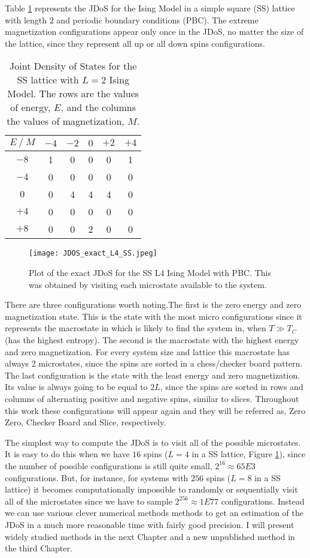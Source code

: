 Table \ref{exact_L2} represents the JDoS for the Ising Model in a simple square (SS) lattice with length $2$ and periodic boundary conditions (PBC). The extreme magnetization configurations appear only once in the JDoS, no matter the size of the lattice, since they represent all up or all down spins configurations. 

\begin{table}[h]
\centering
\caption{Joint Density of States for the SS lattice with $L=2$ Ising Model. The rows are the values of energy, $E$, and the columns the values of magnetization, $M$.}
\label{exact_L2}
\begin{tabular}{c|ccccc}
$E \ / \ M$ & $-4$ & $-2$ &  $0$ & $+2$ &  $+4$ \\ \hline
$-8$  & 1  & 0  & 0 & 0 & 1 \\
$-4$  & 0  & 0  & 0 & 0 & 0 \\
$0$   & 0  & 4  & 4 & 4 & 0 \\
$+4$   & 0  & 0  & 0 & 0 & 0 \\
$+8$   & 0  & 0  & 2 & 0 & 0
\end{tabular}
\end{table}

\begin{figure}[h]
	\centering
	\texttt{[image: JDOS\_exact\_L4\_SS.jpeg]}
	\caption{Plot of the exact JDoS for the SS L4 Ising Model with PBC. This was obtained by visiting each microstate available to the system.}
	\label{exact_L4}
\end{figure}

\pagebreak

There are three configurations worth noting.The first is the zero energy and zero magnetization state. This is the state with the most micro configurations since it represents the macrostate in which is likely to find the system in, when $T\gg T_C$(has the highest entropy). The second is the macrostate with the highest energy and zero magnetization. For every system size and lattice this macrostate has always $2$ microstates, since the spins are sorted in a chess/checker board pattern. The last configuration is the state with the least energy and zero magnetization. Its value is always going to be equal to $2L$, since the spins are sorted in rows and columns of alternating positive and negative spins, similar to slices. Throughout this work these configurations will appear again and they will be referred as, Zero Zero, Checker Board and Slice, respectively. 

The simplest way to compute the JDoS is to visit all of the possible microstates. It is easy to do this when we have $16$ spins ($L=4$ in a SS lattice, Figure \ref{exact_L4}), since the number of possible configurations is still quite small, $2^{16} \approx 65E3$ configurations. But, for instance, for systems with $256$ spins ($L=8$ in a SS lattice) it becomes computationally impossible to randomly or sequentially visit all of the microstates since we have to sample $2^{256} \approx	 1E77$ configurations. 
Instead we can use various clever numerical methods methods to get an estimation of the JDoS in a much more reasonable time with fairly good precision. I will present widely studied methods in the next Chapter and a new unpublished method in the third Chapter.

